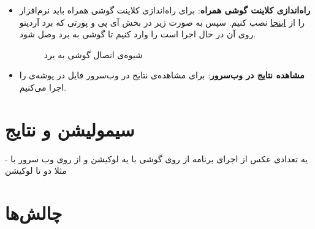 \begin{itemize}
	\item 
	\textbf{راه‌اندازی کلاینت گوشی همراه}:
	برای راه‌اندازی کلاینت گوشی همراه باید نرم‌افزار 
	را از
	\href{https://play.google.com/store/apps/details?id=com.labcenter.iotbuilder&hl=en_GB}{اینجا}
	 نصب کنیم. سپس به صورت زیر در بخش 
	 آی پی و پورتی که برد آردینو روی آن در حال اجرا است را وارد کنیم تا گوشی به برد وصل شود. 
	 \begin{figure}[h!]
	 	\centering			 	
	 	\hfill	 	
	 	\caption{شیوه‌ی اتصال گوشی به برد}	
	 \end{figure}
	
	\item
	\textbf{مشاهده نتایج در وب‌سرور}:
	برای مشاهده‌ی نتایج در وب‌سرور فایل 
	در پوشه‌ی 
	را اجرا می‌کنیم. 	
\end{itemize}

\section{سیمولیشن و نتایج}
- یه تعدادی عکس از اجرای برنامه از روی گوشی با یه لوکیشن و از روی وب سرور با مثلا دو تا لوکیشن


\section{چالش‌ها}